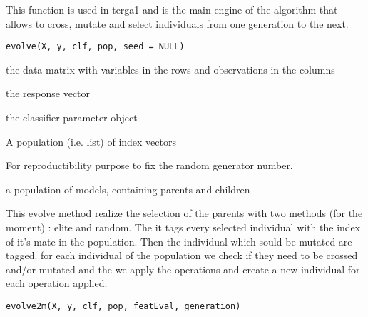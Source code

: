 \documentclass[a4paper]{book}
\begin{document}
%
\begin{Description}
This function is used in terga1 and is the main engine of the algorithm that allows to cross, mutate and select individuals from one generation to the next.
\end{Description}
%
\begin{Usage}
\begin{verbatim}
evolve(X, y, clf, pop, seed = NULL)
\end{verbatim}
\end{Usage}
%
\begin{Arguments}
\begin{ldescription}
\item[\code{X:}] the data matrix with variables in the rows and observations in the columns

\item[\code{y:}] the response vector

\item[\code{clf:}] the classifier parameter object

\item[\code{pop:}] A population (i.e. list) of index vectors

\item[\code{seed:}] For reproductibility purpose to fix the random generator number.
\end{ldescription}
\end{Arguments}
%
\begin{Value}
a population of models, containing parents and children
\end{Value}
%
\begin{Description}
This evolve method realize the selection of the parents with 
two methods (for the moment) : elite and random. The it tags every selected 
individual with the index of it's mate in the population. Then the individual 
which sould be mutated are tagged. for each individual of the population we 
check if they need to be crossed and/or mutated and the we apply the operations 
and create a new individual for each operation applied.
\end{Description}
%
\begin{Usage}
\begin{verbatim}
evolve2m(X, y, clf, pop, featEval, generation)
\end{verbatim}
\end{Usage}
\end{document}
